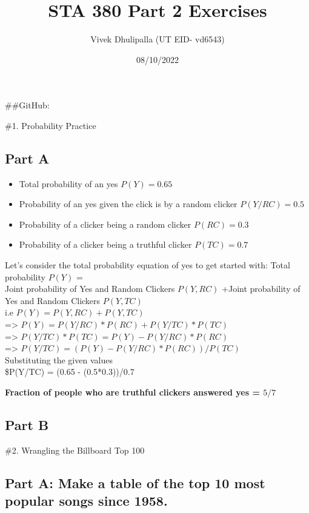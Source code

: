 \documentclass[
  12pt,
]{article}
\title{STA 380 Part 2 Exercises}
\author{Vivek Dhulipalla (UT EID- vd6543)}
\date{08/10/2022}
\providecommand{\tightlist}{%
  \setlength{\itemsep}{0pt}\setlength{\parskip}{0pt}}
\begin{document}
\maketitle

\#\#GitHub:

\tableofcontents
\clearpage

\#1. Probability Practice

\hypertarget{part-a}{%
\subsection{Part A}\label{part-a}}

\begin{itemize}
\tightlist
\item
  Total probability of an yes \(P(Y) = 0.65\)
\item
  Probability of an yes given the click is by a random clicker
  \(P(Y/RC) = 0.5\)
\item
  Probability of a clicker being a random clicker \(P(RC) = 0.3\)
\item
  Probability of a clicker being a truthful clicker \(P(TC) = 0.7\)
\end{itemize}

Let's consider the total probability equation of yes to get started
with: Total probability \(P(Y)\) =\\
Joint probability of Yes and Random Clickers \(P(Y,RC)\) +Joint
probability of Yes and Random Clickers \(P(Y,TC)\)\\
i.e \(P(Y) = P(Y,RC) + P(Y,TC)\)\\
=\textgreater{} \(P(Y) = P(Y/RC)*P(RC) + P(Y/TC)*P(TC)\)\\
=\textgreater{} \(P(Y/TC)*P(TC) = P(Y) - P(Y/RC)*P(RC)\)\\
=\textgreater{} \(P(Y/TC) = (P(Y) - P(Y/RC)*P(RC))/P(TC)\)\\
Substituting the given values\\
\$P(Y/TC) = (0.65 - (0.5*0.3))/0.7

\textbf{Fraction of people who are truthful clickers answered yes =
\(5/7\)}

\hypertarget{part-b}{%
\subsection{Part B}\label{part-b}}

\nextpage

\#2. Wrangling the Billboard Top 100

\hypertarget{part-a-make-a-table-of-the-top-10-most-popular-songs-since-1958.}{%
\subsection{Part A: Make a table of the top 10 most popular songs since
1958.}\label{part-a-make-a-table-of-the-top-10-most-popular-songs-since-1958.}}
\end{document}
